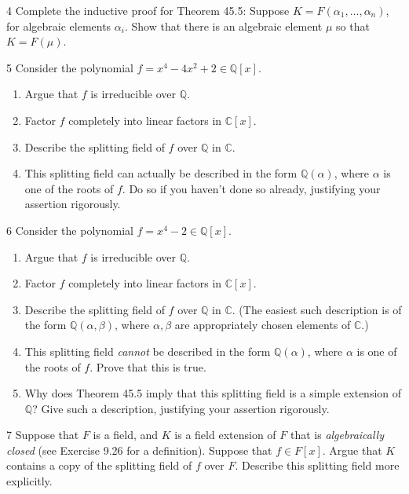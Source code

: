 \begin{problem}{4}
    Complete the inductive proof for Theorem 45.5: Suppose
    $K = F(\alpha_1, \ldots, \alpha_n)$, for algebraic elements $\alpha_i$. Show that there
    is an algebraic element $\mu$ so that $K = F(\mu)$.
\end{problem}
\unsolved

\begin{problem}{5}
    Consider the polynomial $f = x^4 - 4x^2 + 2 \in \mathbb{Q}[x]$.
    \begin{enumerate}
        \item[(a)] Argue that $f$ is irreducible over $\mathbb{Q}$.
        \item[(b)] Factor $f$ completely into linear factors in $\mathbb{C}[x]$.
        \item[(c)] Describe the splitting field of $f$ over $\mathbb{Q}$ in $\mathbb{C}$.
        \item[(d)] This splitting field can actually be described in the form
        $\mathbb{Q}(\alpha)$, where $\alpha$ is one of the roots of $f$. Do so if you
        haven't done so already, justifying your assertion rigorously.
    \end{enumerate}
\end{problem}
\unsolved

\begin{problem}{6}
    Consider the polynomial $f = x^4 - 2 \in \mathbb{Q}[x]$.
    \begin{enumerate}
        \item[(a)] Argue that $f$ is irreducible over $\mathbb{Q}$.
        \item[(b)] Factor $f$ completely into linear factors in $\mathbb{C}[x]$.
        \item[(c)] Describe the splitting field of $f$ over $\mathbb{Q}$ in $\mathbb{C}$.
        (The easiest such description is of the form $\mathbb{Q}(\alpha, \beta)$, where
        $\alpha, \beta$ are appropriately chosen elements of $\mathbb{C}$.)
        \item[(d)] This splitting field \emph{cannot} be described in the form
        $\mathbb{Q}(\alpha)$, where $\alpha$ is one of the roots of $f$. Prove that this is
        true.
        \item[(e)] Why does Theorem 45.5 imply that this splitting field is a simple
        extension of $\mathbb{Q}$? Give such a description, justifying your assertion
        rigorously.
    \end{enumerate}
\end{problem}
\unsolved

\begin{problem}{7}
    Suppose that $F$ is a field, and $K$ is a field extension of $F$ that is
    \emph{algebraically closed} (see Exercise 9.26 for a definition). Suppose that
    $f \in F[x]$. Argue that $K$ contains a copy of the splitting field of $f$ over $F$.
    Describe this splitting field more explicitly.
\end{problem}
\unsolved
